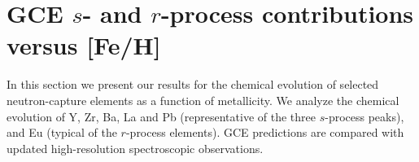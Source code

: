 \documentclass[manuscript]{aastex}
\begin{document}
\begin{table}
\caption{The $s$ contributions to elements from
Sr to Cd at $t_\odot$ = 9.2 Gyr and $t_{Gal}$ = 13.1 Gyr.}\label{Tab2}
\centering
{}
\end{table}



\section{GCE $s$- and $r$-process contributions versus {[Fe/H]} }\label{z}



In this section we present our results for the chemical evolution of selected
neutron-capture elements as a function of metallicity.
We analyze the chemical evolution of Y, Zr, Ba, La and Pb (representative 
of the three $s$-process peaks), and Eu (typical of the $r$-process elements).
GCE predictions are compared with updated high-resolution
spectroscopic observations.
\end{document}
